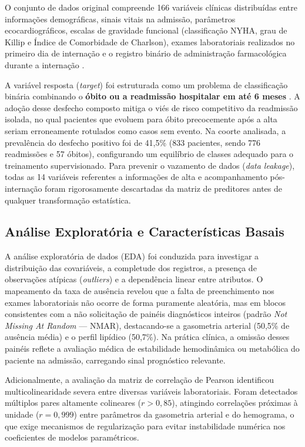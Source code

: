 \documentclass[conference]{IEEEtran}
\begin{document}
O conjunto de dados original compreende 166 variáveis clínicas distribuídas entre informações demográficas, sinais vitais na admissão, parâmetros ecocardiográficos, escalas de gravidade funcional (classificação NYHA, grau de Killip e Índice de Comorbidade de Charlson), exames laboratoriais realizados no primeiro dia de internação e o registro binário de administração farmacológica durante a internação \cite{b1, b2}.

A variável resposta (\textit{target}) foi estruturada como um problema de classificação binária combinando o \textbf{óbito ou a readmissão hospitalar em até 6 meses} \cite{b4}. A adoção desse desfecho composto mitiga o viés de risco competitivo da readmissão isolada, no qual pacientes que evoluem para óbito precocemente após a alta seriam erroneamente rotulados como casos sem evento. Na coorte analisada, a prevalência do desfecho positivo foi de 41,5\% (833 pacientes, sendo 776 readmissões e 57 óbitos), configurando um equilíbrio de classes adequado para o treinamento supervisionado. Para prevenir o vazamento de dados (\textit{data leakage}), todas as 14 variáveis referentes a informações de alta e acompanhamento pós-internação foram rigorosamente descartadas da matriz de preditores antes de qualquer transformação estatística.

\subsection{Análise Exploratória e Características Basais}
A análise exploratória de dados (EDA) foi conduzida para investigar a distribuição das covariáveis, a completude dos registros, a presença de observações atípicas (\textit{outliers}) e a dependência linear entre atributos. O mapeamento da taxa de ausência revelou que a falta de preenchimento nos exames laboratoriais não ocorre de forma puramente aleatória, mas em blocos consistentes com a não solicitação de painéis diagnósticos inteiros (padrão \textit{Not Missing At Random} --- NMAR), destacando-se a gasometria arterial (50,5\% de ausência média) e o perfil lipídico (50,7\%). Na prática clínica, a omissão desses painéis reflete a avaliação médica de estabilidade hemodinâmica ou metabólica do paciente na admissão, carregando sinal prognóstico relevante.

Adicionalmente, a avaliação da matriz de correlação de Pearson identificou multicolinearidade severa entre diversas variáveis laboratoriais. Foram detectados múltiplos pares altamente colineares ($r > 0,85$), atingindo correlações próximas à unidade ($r = 0,999$) entre parâmetros da gasometria arterial e do hemograma, o que exige mecanismos de regularização para evitar instabilidade numérica nos coeficientes de modelos paramétricos.
\end{document}
